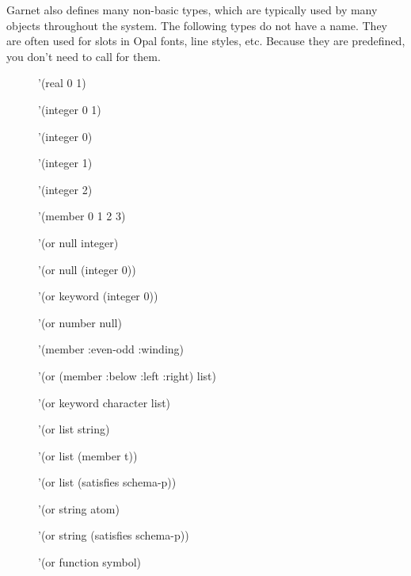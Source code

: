 \begin{group}
Garnet also defines many non-basic types, which are typically used
by many objects throughout the system.  The following types do not have a
name.  They are often used for slots in
Opal fonts, line styles, etc.  Because they are predefined, you don't
need to call  for them.

\vspace{.5 line}
\begin{description}
\item[] '(real 0 1)

\item[] '(integer 0 1)

\item[] '(integer 0)

\item[] '(integer 1)

\item[] '(integer 2)

\item[] '(member 0 1 2 3)

\item[] '(or null integer)

\item[] '(or null (integer 0))

\item[] '(or keyword (integer 0))

\item[] '(or number null)

\item[] '(member :even-odd :winding)

\item[] '(or (member :below :left :right) list)

\item[] '(or keyword character list)

\item[] '(or list string)

\item[] '(or list (member t))

\item[] '(or list (satisfies schema-p))

\item[] '(or string atom)

\item[] '(or string (satisfies schema-p))

\item[] '(or function symbol)


\end{description}
\end{group}
